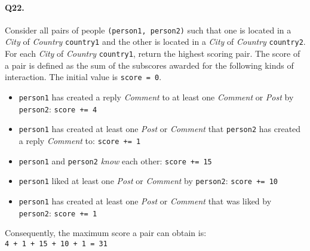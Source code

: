 \paragraph{Q22.}
Consider all pairs of people \texttt{(person1,\ person2)} such that one
is located in a \emph{City} of \emph{Country} \texttt{country1} and the
other is located in a \emph{City} of \emph{Country} \texttt{country2}.
For each \emph{City} of \emph{Country} \texttt{country1}, return the
highest scoring pair.
The score of a pair is defined as the sum of the subscores awarded for
the following kinds of interaction. The initial value is
\texttt{score\ =\ 0}.
\begin{itemize}
\tightlist
\item
  \texttt{person1} has created a reply \emph{Comment} to at least one
  \emph{Comment} or \emph{Post} by \texttt{person2}:
  \texttt{score\ +=\ 4}
\item
  \texttt{person1} has created at least one \emph{Post} or
  \emph{Comment} that \texttt{person2} has created a reply
  \emph{Comment} to: \texttt{score\ +=\ 1}
\item
  \texttt{person1} and \texttt{person2} \emph{know} each other:
  \texttt{score\ +=\ 15}
\item
  \texttt{person1} liked at least one \emph{Post} or \emph{Comment} by
  \texttt{person2}: \texttt{score\ +=\ 10}
\item
  \texttt{person1} has created at least one \emph{Post} or
  \emph{Comment} that was liked by \texttt{person2}:
  \texttt{score\ +=\ 1}
\end{itemize}
Consequently, the maximum score a pair can obtain is:
\texttt{4\ +\ 1\ +\ 15\ +\ 10\ +\ 1\ =\ 31}
